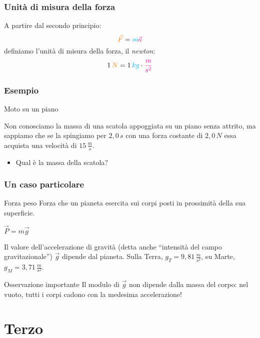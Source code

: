 \documentclass[]{beamer}
\theoremstyle{plain}
\begin{document}
\begin{frame}
  \frametitle{Unità di misura della forza}
  A partire dal secondo principio: \[ \textcolor{orange}{\vec{F}} = \textcolor{cyan}{m}  \textcolor{magenta}{\vec{a}}  \]
  definiamo l'unità di misura della forza, il \emph{newton}:
  \[ 1 \, \textcolor{orange}{N} = 1 \, \textcolor{cyan}{kg} \cdot \textcolor{magenta}{\frac{m}{s^2}} \]
\end{frame}


\begin{frame}
\frametitle{Esempio}
\begin{exampleblock}{Moto su un piano}
{\small Non conosciamo la massa di una scatola appoggiata su un piano senza attrito, ma sappiamo che se la spingiamo per $ 2,0 \, s $ con una forza costante di $ 2,0 \, N $ essa acquista una velocità di $ 15 \, \frac{m}{s} $. 

\begin{itemize}
  \item Qual è la massa della scatola?
\end{itemize}}
\end{exampleblock}
\end{frame}



\begin{frame}
  \frametitle{Un caso particolare}
\begin{block}{Forza peso}
Forza che un pianeta esercita sui corpi posti in prossimità della sua superficie.\pause
\begin{center}
\colorbox{marroncino!30}{$ \vec{P} = m \vec{g} $}
\end{center}\pause
Il valore dell'accelerazione di gravità (detta anche ``intensità del campo gravitazionale'') $ \vec{g} $ dipende dal pianeta. Sulla Terra, $ g_T = 9,81 \, \frac{m}{s^2} $, su Marte, $ g_M = 3,71 \, \frac{m}{s^2} $.
\end{block}\pause
\begin{alertblock}{Osservazione importante}
  Il modulo di $ \vec{g} $ non dipende dalla massa del corpo: nel vuoto, tutti i corpi cadono con la medesima accelerazione! \href{video/Piumapalla.mp4}{}
\end{alertblock}
\end{frame}





\section{Terzo}
\end{document}
